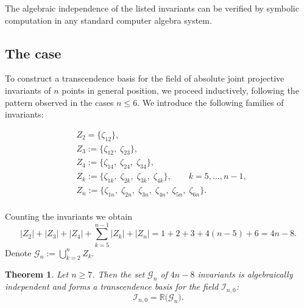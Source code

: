 \documentclass[12pt,reqno]{amsart}
\newtheorem{theorem}{Theorem}
\begin{document}
The algebraic independence of the listed invariants can be verified by symbolic computation in any standard computer algebra system.


















\subsection{The case }
To construct a transcendence basis for the field of absolute joint projective invariants of \(n\) points in general position, we proceed inductively, following the pattern observed in the cases \(n \leq 6\). We introduce the following families of invariants:

\begin{align*}
&Z_2 = \{\zeta_{12}\},\\
&Z_3 := \{\zeta_{12},\; \zeta_{23}\},\\
&Z_4 := \{\zeta_{14},\; \zeta_{24},\; \zeta_{34}\},\\
&Z_k := \{\zeta_{1k},\; \zeta_{2k},\; \zeta_{3k},\; \zeta_{4k}\}, \qquad k = 5, \dots, n-1,\\
&Z_n := \{\zeta_{1n},\; \zeta_{2n},\; \zeta_{3n},\; \zeta_{4n},\; \zeta_{5n},\; \zeta_{6n}\}.\\
\end{align*}

Counting the invariants we obtain
\[
|Z_2|+|Z_3|+|Z_4|+\sum_{k=5}^{n-1}|Z_k|+|Z_n|
        = 1+2+3+4(n-5)+6 = 4n-8.
\]
Denote
\(
\mathcal G_n := \bigcup_{k=2}^{n} Z_k.
\)



\begin{theorem}
Let $n \geq 7$. Then the set $\mathcal G_n$ of $4n-8$ invariants is algebraically independent and forms a transcendence basis for the field $\mathcal I_{n,0}$:
\[
\mathcal I_{n,0} = \mathbb{R}\bigl( \mathcal G_n \bigr).
\]

\end{theorem}
\end{document}
